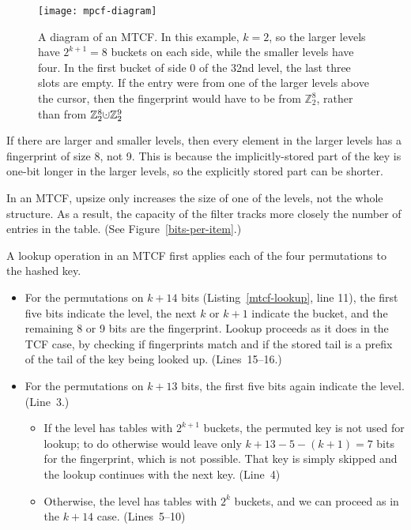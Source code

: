 \documentclass[sigconf]{acmart}
\newcommand{\ints}{\mathbb{Z}}
\newcommand{\dotcup}{\ensuremath{\mathaccent\cdot\cup}}
\begin{document}
\begin{figure}
  \texttt{[image: mpcf-diagram]}
\caption{\label{mtcf-diagram}
A diagram of an MTCF.
In this example, $k = 2$, so the larger levels have $2^{k+1} = 8$ buckets on each side, while the smaller levels have four.
In the first bucket of side 0 of the 32nd level, the last three slots are empty.
If the entry were from one of the larger levels above the cursor, then the fingerprint would have to be from $\ints_2^8$, rather than from $\ints_2^8 \dotcup \ints_2^9$
}

\end{figure}

If there are larger and smaller levels, then every element in the larger levels has a fingerprint of size 8, not 9.
This is because the implicitly-stored part of the key is one-bit longer in the larger levels, so the explicitly stored part can be shorter.

In an MTCF, upsize only increases the size of one of the levels, not the whole structure.
As a result, the capacity of the filter tracks more closely the number of entries in the table. (See Figure~\ref{bits-per-item}.)

A lookup operation in an MTCF first applies each of the four permutations to the hashed key.
\begin{itemize}
\item For the permutations on $k + 14$ bits (Listing~\ref{mtcf-lookup}, line 11), the first five bits indicate the level, the next $k$ or $k+1$ indicate the bucket, and the remaining 8 or 9 bits are the fingerprint.
Lookup proceeds as it does in the TCF case, by checking if fingerprints match and if the stored tail is a prefix of the tail of the key being looked up. (Lines~15--16.)
\item For the permutations on $k + 13$ bits, the first five bits again indicate the level. (Line~3.)
\begin{itemize}
\item If the level has tables with $2^{k+1}$ buckets, the permuted key is not used for lookup; to do otherwise would leave only $k+13 - 5 - (k+1) = 7$ bits for the fingerprint, which is not possible.
That key is simply skipped and the lookup continues with the next key. (Line~4)
\item Otherwise, the level has tables with $2^k$ buckets, and we can proceed as in the $k+14$ case. (Lines~5--10)
\end{itemize}
\end{itemize}
\end{document}
